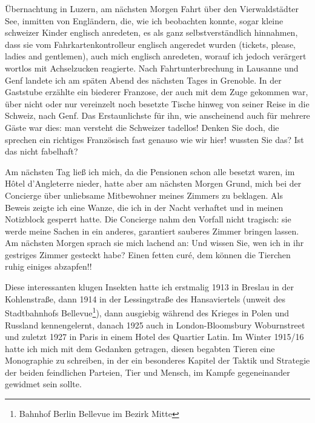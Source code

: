 \documentclass[a5paper,pagesize,10pt,twoside=true]{scrbook}
\begin{document}
Übernachtung in Luzern, am nächsten Morgen Fahrt über den Vierwaldstädter See, inmitten von Engländern, die, wie ich beobachten konnte, sogar kleine schweizer Kinder englisch anredeten, es als ganz selbstverständlich hinnahmen, dass sie vom Fahrkartenkontrolleur englisch angeredet wurden (tickets, please, ladies and gentlemen), auch mich englisch anredeten, worauf ich jedoch verärgert wortlos mit Achselzucken reagierte. Nach Fahrtunterbrechung in Lausanne und Genf landete ich am späten Abend des nächsten Tages in Grenoble. In der Gaststube erzählte ein biederer Franzose, der auch mit dem Zuge gekommen war, über nicht oder nur vereinzelt noch besetzte Tische hinweg von seiner Reise in die Schweiz, nach Genf. Das Erstaunlichste für ihn, wie anscheinend auch für mehrere Gäste war dies: man versteht die Schweizer tadellos! Denken Sie doch, die sprechen ein richtiges Französisch fast genauso wie wir hier! wussten Sie das? Ist das nicht fabelhaft?

Am nächsten Tag ließ ich mich, da die Pensionen schon alle besetzt waren, im Hôtel d'Angleterre nieder, hatte aber am nächsten Morgen Grund, mich bei der Concierge über unliebsame Mitbewohner meines Zimmers zu beklagen. Als Beweis zeigte ich eine Wanze, die ich in der Nacht verhaftet und in meinen Notizblock gesperrt hatte. Die Concierge nahm den Vorfall nicht tragisch: sie werde meine Sachen in ein anderes, garantiert sauberes Zimmer bringen lassen. Am nächsten Morgen sprach sie mich lachend an: Und wissen Sie, wen ich in ihr gestriges Zimmer gesteckt habe? Einen fetten curé, dem können die Tierchen ruhig einiges abzapfen!!

Diese interessanten klugen Insekten hatte ich erstmalig 1913 in Breslau in der Kohlenstraße, dann 1914 in der Lessingstraße des Hansaviertels (unweit des Stadtbahnhofs Bellevue\footnote{Bahnhof Berlin Bellevue im Bezirk Mitte}), dann ausgiebig während des Krieges in Polen und Russland kennengelernt, danach 1925 auch in London-Bloomsbury Woburnstreet und zuletzt 1927 in Paris in einem Hotel des Quartier Latin. Im Winter 1915/16 hatte ich mich mit dem Gedanken getragen, diesen begabten Tieren eine Monographie zu schreiben, in der ein besonderes Kapitel der Taktik und Strategie der beiden feindlichen Parteien, Tier und Mensch, im Kampfe gegeneinander gewidmet sein sollte.\\
\end{document}
